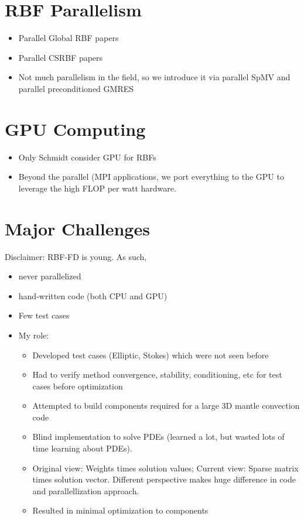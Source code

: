\section{RBF Parallelism}
\begin{itemize} 
	\item Parallel Global RBF papers
	\item Parallel CSRBF papers
	\item Not much parallelism in the field, so we introduce it via parallel SpMV and parallel preconditioned GMRES
\end{itemize} 

\section{GPU Computing} 
\begin{itemize} 
	\item Only Schmidt consider GPU for RBFs
	\item Beyond the parallel (MPI applications, we port everything to the GPU to leverage the high FLOP per watt hardware. 
\end{itemize} 

\section{Major Challenges}
Disclaimer: RBF-FD is young. As such, 
\begin{itemize}
	\item never parallelized
	\item hand-written code (both CPU and GPU)
	\item Few test cases
	\item My role:
	\begin{itemize} 
	\item Developed test cases (Elliptic, Stokes) which were not seen before
	\item Had to verify method convergence, stability, conditioning, etc for test cases before optimization
	\item Attempted to build components required for a large 3D mantle convection code
	\item Blind implementation to solve PDEs (learned a lot, but wasted lots of time learning about PDEs). 
	\item Original view: Weights times solution values; Current view: Sparse matrix times solution vector. Different perspective makes huge difference in code and parallellization approach.
	\item Resulted in minimal optimization to components
	\end{itemize} 
\end{itemize} 

